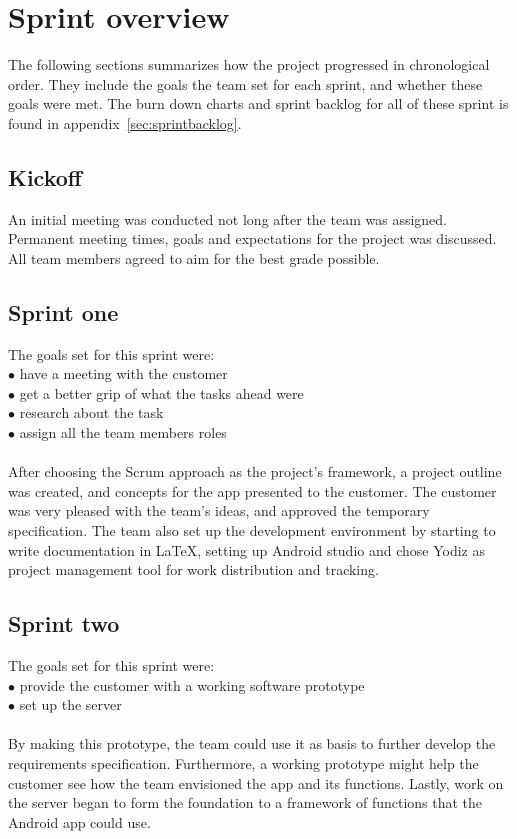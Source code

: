 \section{Sprint overview}
\label{sec:sprintOverview}
The following sections summarizes how the project progressed in chronological order. They include the goals the team set for each sprint, and whether these goals were met. The burn down charts and sprint backlog for all of these sprint is found in appendix~\ref{sec:sprintbacklog}.

\subsection{Kickoff}
An initial meeting was conducted not long after the team was assigned. Permanent meeting times, goals and expectations for the project was discussed. All team members agreed to aim for the best grade possible.

\subsection{Sprint one}
The goals set for this sprint were:\\
$\bullet$\hspace{0.25cm} have a meeting with the customer\\
$\bullet$\hspace{0.25cm} get a better grip of what the tasks ahead were\\
$\bullet$\hspace{0.25cm} research about the task\\
$\bullet$\hspace{0.25cm} assign all the team members roles\\\\
After choosing the Scrum approach as the project's framework, a project outline was created, and concepts for the app presented to the customer. The customer was very pleased with the team's ideas, and approved the temporary specification. The team also set up the development environment by starting to write documentation in \LaTeX, setting up Android studio and chose Yodiz as project management tool for work distribution and tracking.

\subsection{Sprint two}
The goals set for this sprint were:\\
$\bullet$\hspace{0.25cm} provide the customer with a working software prototype\\
$\bullet$\hspace{0.25cm} set up the server\\\\
By making this prototype, the team could use it as basis to further develop the requirements specification. Furthermore, a working prototype might help the customer see how the team envisioned the app and its functions. Lastly, work on the server began to form the foundation to a framework of functions that the Android app could use. 

